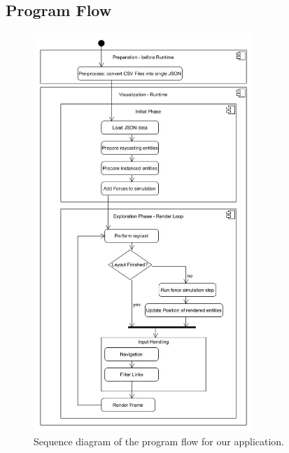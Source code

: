 \subsection{Program Flow}
\label{section:programFlow}
\begin{figure}[!hbt]
    \centering
    \includegraphics[width=0.74\textwidth]{graphics/vrgraph_flow.jpg}
    \caption{Sequence diagram of the program flow for our application.}
    \label{fig:impl_programFlow}
\end{figure}

